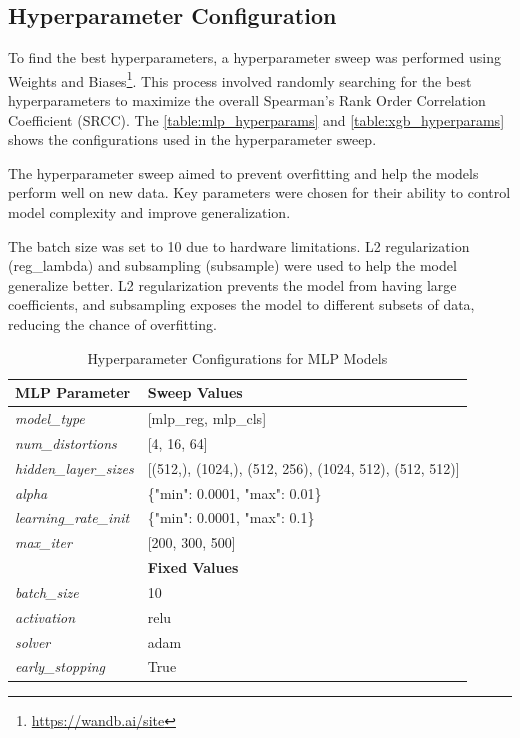 \subsection{Hyperparameter Configuration}
\label{sub:HyperparamConfig}
To find the best hyperparameters, a hyperparameter sweep was performed using Weights and Biases\footnote{\url{https://wandb.ai/site}}. This process involved randomly searching for the best hyperparameters to maximize the overall Spearman’s Rank Order Correlation Coefficient (SRCC). The \autoref{table:mlp_hyperparams} and \autoref{table:xgb_hyperparams} shows the configurations used in the hyperparameter sweep. \par
\vspace{\baselineskip}
\noindent
The hyperparameter sweep aimed to prevent overfitting and help the models perform well on new data. Key parameters were chosen for their ability to control model complexity and improve generalization. \par
\vspace{\baselineskip}
\noindent
The batch size was set to 10 due to hardware limitations. L2 regularization (reg\_lambda) and subsampling (subsample) were used to help the model generalize better. L2 regularization prevents the model from having large coefficients, and subsampling exposes the model to different subsets of data, reducing the chance of overfitting. \par
\begin{table}[ht]
\centering
\begin{tabular}{|l|l|}
\hline
\textbf{MLP Parameter} & \textbf{Sweep Values} \\
\hline
\textit{model\_type} & [mlp\_reg, mlp\_cls] \\
\textit{num\_distortions} & [4, 16, 64] \\
\textit{hidden\_layer\_sizes} & [(512,), (1024,), (512, 256), (1024, 512), (512, 512)] \\
\textit{alpha} & \{"min": 0.0001, "max": 0.01\} \\
\textit{learning\_rate\_init} & \{"min": 0.0001, "max": 0.1\} \\
\textit{max\_iter} & [200, 300, 500] \\
\hline
\textbf{} & \textbf{Fixed Values} \\
\hline
\textit{batch\_size} & 10 \\
\textit{activation} & relu \\
\textit{solver} & adam \\
\textit{early\_stopping} & True \\
\hline
\end{tabular}
\clearpage
\caption{Hyperparameter Configurations for MLP Models}
\label{table:mlp_hyperparams}
\end{table}
